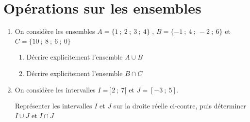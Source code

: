 \documentclass[oneside,12pt]{exam}          %
\begin{document}
\section{Opérations sur les ensembles}
\begin{enumerate}[itemsep = 2mm]
	\item On considère les ensembles $A = \{ 1 ~;~ 2 ~;~ 3  ~;~ 4 \}$ , $B = \{ -1 ~;~ 4 ~;~ -2 ~;~ 6\}$ et $C = \{ 10 ~;~ 8 ~;~ 6 ~;~ 0\}$
	\begin{enumerate}
		\item Décrire explicitement l'ensemble $A \cup B$
		\item Décrire explicitement l'ensemble $B \cap C$
	\end{enumerate}
	
	\item On considère les intervalles $I = ]2 ~;~ 7]$ et $J = [-3 ~;~ 5]$.
	
	Représenter les intervalles $I$ et $J$ sur la droite réelle ci-contre, puis déterminer $I \cup J$ et $I \cap J$
	
	\vspace*{5mm}
	
	\begin{center}
	\end{center}
\end{enumerate}



\newpage
{}
\end{document}
